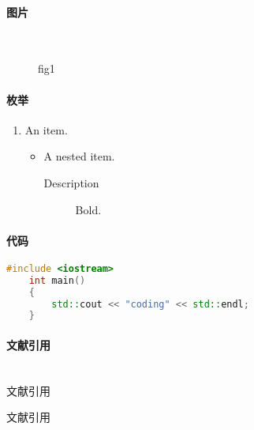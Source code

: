 \documentclass[UTF8, a4paper]{ctexart}
\begin{document}
\paragraph{图片}~{}
\begin{figure}[!htbp]
    \centering  %
    \begin{minipage}{10em}
        \centering
        \caption{fig1}    
    \end{minipage}
\end{figure}

\paragraph{枚举}
\begin{enumerate}   %
    \item An item.
    \begin{itemize} %
        \item A nested item.
        \begin{description} %
            \item[Description] Bold. 
        \end{description}
    \end{itemize}
\end{enumerate}


\paragraph{代码}
\begin{lstlisting}[language=C++]
    #include <iostream>
    int main()
    {
        std::cout << "coding" << std::endl;
    }
\end{lstlisting}

\paragraph{文献引用}~{}\\
文献引用
\cite{引用}
\begin{thebibliography}{}
     文献引用
\end{thebibliography}

\end{document}
